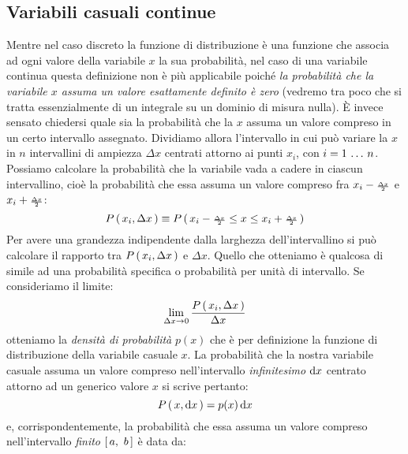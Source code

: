 \subsection{Variabili casuali continue}

Mentre nel caso discreto la funzione di distribuzione \`e una
funzione che associa ad ogni valore della variabile $x$ la sua probabilit\`a,
nel caso di una variabile continua questa definizione non \`e pi\`u applicabile
poich\'e {\itshape la probabilit\`a che la variabile $x$ assuma un valore
esattamente definito \`e zero} (vedremo tra poco che si tratta essenzialmente
di un integrale su un dominio di misura nulla).
\`E invece sensato chiedersi quale sia la probabilit\`a che la $x$ assuma
un valore compreso in un certo intervallo assegnato.
Dividiamo allora l'intervallo in cui pu\`o variare la $x$ in $n$ intervallini
di ampiezza $\Delta x$ centrati attorno ai punti $x_i$, con
$i = 1 \, \ldots \, n$.
Possiamo calcolare la probabilit\`a che la variabile
vada a cadere in ciascun intervallino, cio\`e la probabilit\`a che essa
assuma un valore compreso fra $x_i - {\scriptscriptstyle \frac{\Delta x}{2}}$ e
$x_i + {\scriptscriptstyle \frac{\Delta x}{2}}$:
$$
\displaystyle P\left(\, x_i,\Delta x \, \right) \equiv \displaystyle P\left(\, x_i - {\scriptscriptstyle \frac{\Delta x}{2}} \leq x
\leq x_i + {\scriptscriptstyle \frac{\Delta x}{2}} \, \right)
$$
Per avere una grandezza indipendente dalla larghezza dell'intervallino
si pu\`o calcolare il rapporto tra $\displaystyle P\left(\, x_i, \Delta x \, \right)$ e $\Delta x$.
Quello che otteniamo \`e qualcosa di simile ad una probabilit\`a
specifica o probabilit\`a per unit\`a di intervallo.
Se consideriamo il limite:
$$
\lim_{\Delta x\to0}  \frac{\displaystyle P\left(\, x_i, \Delta x \, \right)}{\Delta x}
$$
otteniamo la {\itshape densit\`a di probabilit\`a} $p(x)$ che \`e per
definizione la funzione di distribuzione della variabile casuale
$x$.
La probabilit\`a che la nostra variabile casuale assuma un
valore compreso nell'intervallo \emph{infinitesimo} $\mathrm{d} x$ centrato attorno
ad un generico valore $x$ si scrive pertanto:
$$
\displaystyle P\left(\, x, \mathrm{d} x \, \right) = p(x) \, \mathrm{d} x
$$
e, corrispondentemente, la probabilit\`a che essa assuma un valore
compreso nell'intervallo \emph{finito} $\left[ \, a, ~ b \, \right]$ \`e data da:

